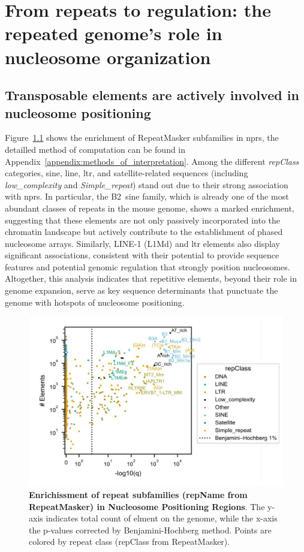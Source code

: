 \documentclass[11pt]{book}
\begin{document}
\chapter{From repeats to regulation: the repeated genome’s role in nucleosome organization}

\section{Transposable elements are actively involved in nucleosome positioning}
Figure~\ref{fig:volcano_npr_repClass} shows the enrichment of RepeatMasker subfamilies in \glspl{npr}, the detailled method of computation can be found in Appendix~\ref{appendix:methods_of_interpretation}. Among the different \textit{repClass} categories, \gls{sine}, \gls{line}, \gls{ltr}, and satellite-related sequences (including \textit{low\_complexity} and \textit{Simple\_repeat}) stand out due to their strong association with \glspl{npr}. In particular, the B2~\gls{sine} family, which is already one of the most abundant classes of repeats in the mouse genome, shows a marked enrichment, suggesting that these elements are not only passively incorporated into the chromatin landscape but actively contribute to the establishment of phased nucleosome arrays. Similarly, LINE-1 (L1Md) and \gls{ltr} elements also display significant associations, consistent with their potential to provide sequence features and potential genomic regulation that strongly position nucleosomes\cite{pelinski_nf-b_2022,bakoulis_endogenous_2022}. Altogether, this analysis indicates that repetitive elements, beyond their role in genome expansion, serve as key sequence determinants that punctuate the genome with hotspots of nucleosome positioning.

\begin{figure}[htbp]
    \centering
    \includegraphics[width=\textwidth]{Figures/Results/volcano_nprs.pdf}
    \caption{\textbf{Enrichissment of repeat subfamilies (repName from RepeatMasker) in Nucleosome Positioning Regions}. The y-axis indicates total count of elment on the genome, while the x-axis the p-values corrected by Benjamini-Hochberg method. Points are colored by repeat class (repClass from RepeatMasker).}
    \label{fig:volcano_npr_repClass}
\end{figure}
\end{document}
